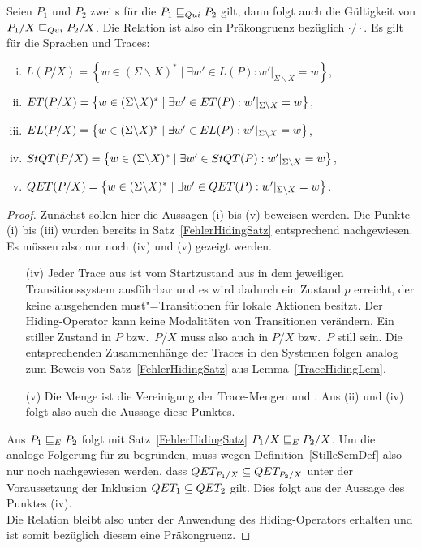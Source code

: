 \begin{Satz}
  \label{StilleHidingSatz}
  Seien $P_1$ und $P_2$ zwei \MEIO{}s für die $P_1 \sqsubseteq  _{Qui} P_2$ gilt, dann folgt
  auch die Gültigkeit von $P_1/X \sqsubseteq  _{Qui} P_2/X$. Die Relation \QRel{} ist also ein
  Präkongruenz bezüglich $\cdot /\cdot$. Es gilt für die Sprachen und Traces:
  \begin{enumerate}[(i)]
    \item $L(P/X) = \left\{w\in (\Sigma\backslash X)^*\mid \exists w'\in L(P):
      w'|_{\Sigma\backslash X} = w\right\}$,
    \item $ET (P/X) = \left\{w\in (\Sigma\backslash X)^*\mid \exists w'\in
      ET(P): w'|_{\Sigma\backslash X} = w\right\}$,
    \item $EL (P/X) = \left\{w\in (\Sigma\backslash X)^*\mid \exists w'\in
      EL(P): w'|_{\Sigma\backslash X} = w\right\}$,
    \item $StQT (P/X) = \left\{w\in (\Sigma\backslash X)^*\mid \exists w'\in
      StQT(P): w'|_{\Sigma\backslash X} = w\right\}$,
    \item $QET (P/X) = \left\{w\in (\Sigma\backslash X)^*\mid \exists w'\in
      QET(P): w'|_{\Sigma\backslash X} = w\right\}$.
  \end{enumerate}
\end{Satz}
\begin{proof}
  Zunächst sollen hier die Aussagen (i) bis (v) beweisen werden. Die Punkte
  (i) bis (iii) wurden bereits in Satz~\ref{FehlerHidingSatz} entsprechend
  nachgewiesen. Es müssen also nur noch (iv) und (v) gezeigt werden.
  \begin{itemize}
    \item[(iv)] Jeder Trace aus \StQT{} ist vom Startzustand aus in dem
      jeweiligen Transitionssystem ausführbar und es wird dadurch ein Zustand
      $p$ erreicht, der keine ausgehenden must"=Transitionen für lokale
      Aktionen besitzt. Der Hiding-Operator kann keine Modalitäten von
      Transitionen verändern. Ein stiller Zustand in $P$ bzw.\ $P/X$ muss also
      auch in $P/X$ bzw.\ $P$ still sein. Die entsprechenden Zusammenhänge der
      Traces in den Systemen folgen analog zum Beweis von
      Satz~\ref{FehlerHidingSatz} aus Lemma~\ref{TraceHidingLem}.
    \item[(v)] Die Menge \QET{} ist die Vereinigung der Trace-Mengen \ET{} und
      \StQT{}. Aus (ii) und (iv) folgt also auch die Aussage diese Punktes.
  \end{itemize}
  Aus $P_1 \sqsubseteq  _E P_2$ folgt mit Satz~\ref{FehlerHidingSatz} $P_1/X \sqsubseteq  _E P_2/X$.
  Um die analoge Folgerung für \QRel{} zu begründen, muss wegen
  Definition~\ref{StilleSemDef} also nur noch nachgewiesen werden, dass $QET
  _{P_1/X} \subseteq QET _{P_2/X}$ unter der Voraussetzung der Inklusion $QET
  _1 \subseteq QET _2$ gilt. Dies folgt aus der Aussage des Punktes (iv).\\
  Die Relation \QRel{} bleibt also unter der Anwendung des Hiding-Operators
  erhalten und ist somit bezüglich diesem eine Präkongruenz.
\end{proof}


